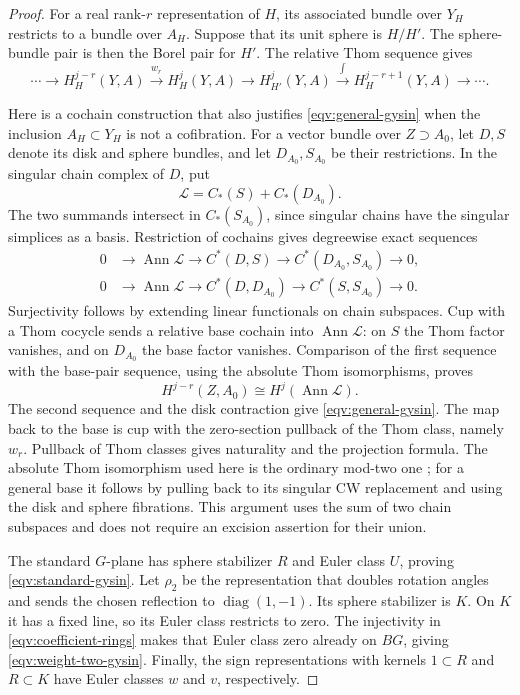 \begin{proof}
For a real rank-\(r\) representation of \(H\), its associated bundle
over \(Y_H\) restricts to a bundle over \(A_H\).
Suppose that its unit sphere is \(H/H'\).
The sphere-bundle pair is then the Borel pair for \(H'\).
The relative Thom sequence gives
\begin{equation}
 \cdots\longrightarrow H_H^{j-r}(Y,A)
 \xrightarrow{\,w_r\,}H_H^j(Y,A)
 \longrightarrow H_{H'}^j(Y,A)
 \xrightarrow{\int}H_H^{j-r+1}(Y,A)\longrightarrow\cdots.
 \label{eqv:general-gysin}
\end{equation}

Here is a cochain construction that also justifies
\eqref{eqv:general-gysin} when the inclusion \(A_H\subset Y_H\) is not
a cofibration.  For a vector bundle over \(Z\supset A_0\), let \(D,S\)
denote its disk and sphere bundles, and let \(D_{A_0},S_{A_0}\)
be their restrictions.  In the singular chain complex of \(D\), put
\[
 \mathcal L=C_*(S)+C_*(D_{A_0}).
\]
The two summands intersect in \(C_*(S_{A_0})\), since singular chains
have the singular simplices as a basis.  Restriction of cochains gives
degreewise exact sequences
\begin{align*}
 0&\longrightarrow\operatorname{Ann}\mathcal L
 \longrightarrow C^*(D,S)
 \longrightarrow C^*(D_{A_0},S_{A_0})\longrightarrow0,\\
 0&\longrightarrow\operatorname{Ann}\mathcal L
 \longrightarrow C^*(D,D_{A_0})
 \longrightarrow C^*(S,S_{A_0})\longrightarrow0.
\end{align*}
Surjectivity follows by extending linear functionals on chain
subspaces.  Cup with a Thom cocycle sends a relative base cochain into
\(\operatorname{Ann}\mathcal L\): on \(S\) the Thom factor vanishes,
and on \(D_{A_0}\) the base factor vanishes.
Comparison of the first sequence with the base-pair sequence, using
the absolute Thom isomorphisms, proves
\[
 H^{j-r}(Z,A_0)\cong H^j(\operatorname{Ann}\mathcal L).
\]
The second sequence and the disk contraction give
\eqref{eqv:general-gysin}.  The map back to the base is cup with the
zero-section pullback of the Thom class, namely \(w_r\).
Pullback of Thom classes gives naturality and the projection formula.
The absolute Thom isomorphism used here is the ordinary mod-two
one \cite[Section~3.2, pp.~88--89]{HatcherVBKT2017};
for a general base it follows by pulling back to its singular
CW replacement and using the disk and sphere fibrations.
This argument uses the sum of two chain subspaces and does not require
an excision assertion for their union.

The standard \(G\)-plane has sphere stabilizer \(R\) and Euler class
\(U\), proving \eqref{eqv:standard-gysin}.
Let \(\rho_2\) be the representation that doubles rotation angles and
sends the chosen reflection to \(\operatorname{diag}(1,-1)\).
Its sphere stabilizer is \(K\).  On \(K\) it has a fixed line, so its
Euler class restricts to zero.  The injectivity in
\eqref{eqv:coefficient-rings} makes that Euler class zero already on
\(BG\), giving \eqref{eqv:weight-two-gysin}.
Finally, the sign representations with kernels \(1\subset R\) and
\(R\subset K\) have Euler classes \(w\) and \(v\), respectively.
\end{proof}

